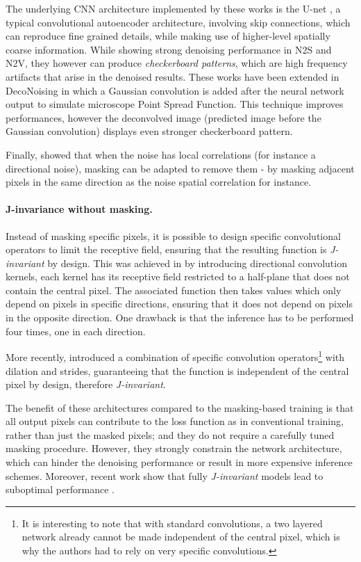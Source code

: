 \documentclass{article}
\begin{document}
The underlying CNN architecture implemented by these works is the U-net \cite{ronneberger2015u}, a typical convolutional autoencoder architecture, involving skip connections, which can reproduce fine grained details, while making use of higher-level spatially coarse information. While showing strong denoising performance in N2S and N2V, they however can produce \textit{checkerboard patterns}, which are high frequency artifacts that arise in the denoised results.
These works have been extended in DecoNoising \cite{goncharova2020} in which a Gaussian convolution is added after the neural network output to simulate microscope Point Spread Function.
This technique improves performances, however the deconvolved image (predicted image before the Gaussian convolution) displays even stronger checkerboard pattern.

Finally, \cite{broaddus2020removing} showed that when the noise has local correlations (for instance a  directional noise),  masking can be adapted to remove them - by masking adjacent pixels in the same direction as the noise spatial correlation for instance.

\paragraph{J-invariance without masking.}
Instead of masking specific pixels, it is possible to design specific convolutional operators to limit the receptive field, ensuring that the resulting function is \textit{J-invariant} by design. This was achieved in \cite{laine2019high} by introducing directional convolution kernels, each kernel has its receptive field restricted to a half-plane that does not contain the central pixel. The associated function then takes values which only depend on pixels in specific directions, ensuring that it does not depend on pixels in the opposite direction. One drawback is that the inference has to be performed four times, one in each direction.

More recently, \cite{lee2020noise2kernel} introduced a combination of specific convolution operators\footnote{It is interesting to note that with standard convolutions, a two layered network already cannot be made independent of the central pixel, which is why the authors had to rely on very specific convolutions.} with dilation and strides, guaranteeing that the function is independent of the central pixel by design, therefore \textit{J-invariant}.

The benefit of these architectures compared to the masking-based training is that all output pixels can contribute to the loss function as in conventional training, rather than just the masked pixels; and they do not require a carefully tuned masking procedure. However, they strongly constrain the network architecture, which can hinder the denoising performance or result in more expensive inference schemes. Moreover, recent work show that fully \textit{J-invariant} models lead to suboptimal performance \cite{xie2020noise2same}.
\end{document}
